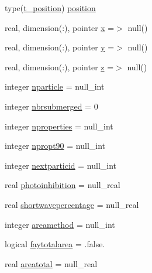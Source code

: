 \begin{DoxyCompactItemize}
\item 
type(\mbox{\hyperlink{structmodulelagrangianglobal_1_1t__position}{t\+\_\+position}}) \mbox{\hyperlink{structmodulelagrangianglobal_1_1t__origin_a9df8716f00d666c3d1f1e8bcd4a83fa0}{position}}
\item 
real, dimension(\+:), pointer \mbox{\hyperlink{structmodulelagrangianglobal_1_1t__origin_a33ed550af08adb8826e317930219a551}{x}} =$>$ null()
\item 
real, dimension(\+:), pointer \mbox{\hyperlink{structmodulelagrangianglobal_1_1t__origin_ac4a97e6723f8ed311c8df981bd648e87}{y}} =$>$ null()
\item 
real, dimension(\+:), pointer \mbox{\hyperlink{structmodulelagrangianglobal_1_1t__origin_ad4118f00a251c01b0a28d74d5387508a}{z}} =$>$ null()
\item 
integer \mbox{\hyperlink{structmodulelagrangianglobal_1_1t__origin_a7cde0e73b2c3847e981c8f71ae63365a}{nparticle}} = null\+\_\+int
\item 
integer \mbox{\hyperlink{structmodulelagrangianglobal_1_1t__origin_a5e5ea11bb830f5ef77b3942ec34b0a82}{nbrsubmerged}} = 0
\item 
integer \mbox{\hyperlink{structmodulelagrangianglobal_1_1t__origin_a9563d653916841a1a46904efccb93ab9}{nproperties}} = null\+\_\+int
\item 
integer \mbox{\hyperlink{structmodulelagrangianglobal_1_1t__origin_a3f8d86ab31142367abc4391bb96fad59}{npropt90}} = null\+\_\+int
\item 
integer \mbox{\hyperlink{structmodulelagrangianglobal_1_1t__origin_a0abd82b1425719cd28862372cdaac4ab}{nextparticid}} = null\+\_\+int
\item 
real \mbox{\hyperlink{structmodulelagrangianglobal_1_1t__origin_aecdf33084f6b9badfe46668ff933944d}{photoinhibition}} = null\+\_\+real
\item 
real \mbox{\hyperlink{structmodulelagrangianglobal_1_1t__origin_a2c6d671e2e20355397c1cd7a55cab27e}{shortwavepercentage}} = null\+\_\+real
\item 
integer \mbox{\hyperlink{structmodulelagrangianglobal_1_1t__origin_a60820b407472ab44475464e83feb4207}{areamethod}} = null\+\_\+int
\item 
logical \mbox{\hyperlink{structmodulelagrangianglobal_1_1t__origin_a7678cb90eca6ce1267da5892bd8aca7a}{faytotalarea}} = .false.
\item 
real \mbox{\hyperlink{structmodulelagrangianglobal_1_1t__origin_a6f8e21d54a0bb5748faef202b3ba0b16}{areatotal}} = null\+\_\+real
\item 

\end{DoxyCompactItemize}
